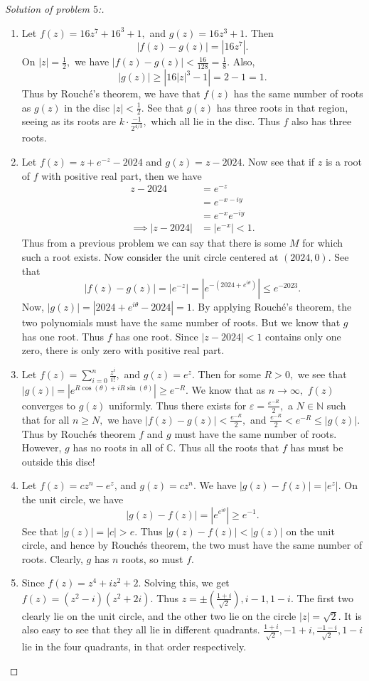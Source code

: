 \documentclass[letterpaper,11pt,twoside]{article}
\theoremstyle{proposition}
\theoremstyle{definition}
\theoremstyle{theorem}
\theoremstyle{definition}
\theoremstyle{definition}
\theoremstyle{definition}
\theoremstyle{lemma}
\theoremstyle{definition}
\theoremstyle{definition}
\theoremstyle{corollary}
\theoremstyle{definition}
\theoremstyle{definition}
\theoremstyle{definition}
\newcommand{\abs}[1]{\left \vert #1 \right \vert}
\begin{document}
	\begin{proof}[Solution of problem $5$:]
	\begin{enumerate}
		\item Let $f(z)=16z^7+16^3+1,$ and $g(z)=16z^3+1.$ Then $$|f(z)-g(z)| = \abs{16z^7}.$$ On $|z|=\frac{1}{2},$ we have $\abs{f(z)-g(z)} < 
		\frac{16}{128}=\frac{1}{8}.$ Also, $$\abs{g(z)} \geq \abs{16 \abs{z}^3-1}= 2-1=1. $$ Thus by Rouch\'{e}'s theorem, we have that $f(z)$ has the same 
		number of roots as $g(z)$ in the disc $\abs{z} < \frac{1}{2}.$ See that $g(z)$ has three roots in that region, seeing as its roots are $ k \cdot 
		\frac{-1}{2^{4/3}},$ which all lie in the disc. Thus $f$ also has three roots.
		\item Let $f(z)= z+e^{-z}-2024$ and $g(z)=z-2024.$ Now see that if $z$ is a root of $f$ with positive real part, then we have 
		\begin{align*}
			z-2024 &= e^{-z}\\
			&= e^{-x-iy}\\
			&= e^{-x}e^{-iy}\\
			\implies \abs{z-2024} &= \abs{e^{-x}} < 1.
		\end{align*}
	Thus from a previous problem we can say that there is some $M$ for which such a root exists. 
	Now consider the unit circle centered at $(2024,0).$ See that $$\abs{f(z)-g(z)} = \abs{e^{-z}} = \abs{e^{-(2024+ e^{i\theta})}} \leq e^{-2023}.$$
	Now, $\abs{g(z)}= \abs{2024 + e^{i\theta} -2024}=1.$ By applying Rouch\'{e}'s theorem, the two polynomials must have the same number of roots. But we 
	know that $g$ has one root. Thus $f$ has one root. Since $\abs{z-2024}<1$ contains only one zero, there is only zero with positive real part. 
	\item Let $f(z)= \sum_{i=0}^n \frac{z^i}{i!},$ and $g(z)=e^z.$ Then for some $R>0,$ we see that $\abs{g(z)} = \abs{e^{R\cos(\theta)+iR\sin (\theta)}} 
	\geq e^{-R}.$ We know that as $n \to \infty,$ $f(z)$ converges to $g(z)$ uniformly. Thus there exists for $\varepsilon = \frac{e^{-R}}{2},$ a $N \in 
	\mathbb{N}$ such that for all $n \geq N,$ we have $\abs{f(z)-g(z)} < \frac{e^{-R}}{2},$ and $\frac{e^{-R}}{2} < e^{-R} \leq \abs{g(z)}.$
	Thus by Rouch\'{e}s theorem $f$ and $g$ must have the same number of roots. However, $g$ has no roots in all of $\mathbb{C}$. Thus all the roots that 
	$f$ has must be outside this disc!
	\item Let $f(z)=cz^n-e^z$, and $g(z)=cz^n.$ We have $\abs{g(z)-f(z)}=\abs{e^{z}}.$ On the unit circle, we have $$\abs{g(z)-f(z)} = \abs{e^{e^{i\theta}}} 
	\geq e^{-1}.$$ See that $\abs{g(z)} = \abs{c} > e.$ Thus $\abs{g(z)-f(z)} < \abs{g(z)}$ on the unit circle, and hence by Rouch\'{e}s theorem, the two 
	must have the same number of roots. Clearly, $g$ has $n$ roots, so must $f.$
	\item Since $f(z)=z^4+iz^2+2.$ Solving this, we get $f(z)=(z^2-i)(z^2+2i).$ Thus $z= \pm \left( \frac{1+i}{\sqrt{2}} \right), i-1, 1-i. $ The first two 
	clearly lie on the unit circle, and the other two lie on the circle $\abs{z}= \sqrt{2}.$ It is also easy to see that they all lie in different 
	quadrants. $\frac{1+i}{\sqrt{2}}, -1+i, \frac{-1-i}{\sqrt{2}}, 1-i $ lie in the four quadrants, in that order respectively. 
	

\end{enumerate}
\end{proof}
\end{document}
